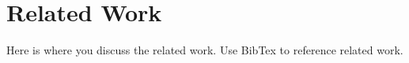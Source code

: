 \chapter{Related Work}

Here is where you discuss the related work. Use BibTex to reference related work.
